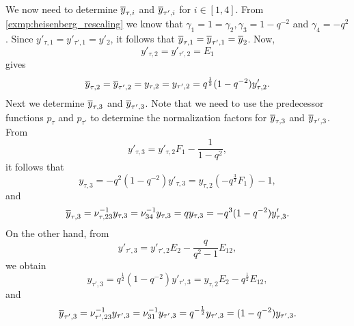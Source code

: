 \begin{example}
	We now need to determine $\overline{y}_{\tau, i}$ and $\overline{y}_{\tau',i}$ for $i \in [1,4]$. From
	\cref{exmp:heisenberg_rescaling} we know that $\gamma_1 = 1 = \gamma_2, \gamma_3 = 1
		-q^{-2}$ and $\gamma_4 = -q^2$. Since $y'_{\tau, 1} = y'_{\tau',1} = y'_2$, it follows
	that $\overline{y}_{\tau, 1} = \overline{y}_{\tau',1} = \overline{y}_2$. Now,
	\begin{equation*}
		y'_{\tau, 2} = y'_{\tau', 2} = E_1
	\end{equation*}
	gives
	\begin{equation*}
		\overline{y}_{\tau, 2} = \overline{y}_{\tau', 2} = y_{\tau, 2} = y_{\tau', 2} =  q^{\frac{1}{2}}(1-q^{-2})y'_{\tau, 2}.
	\end{equation*}
	Next we determine $\overline{y}_{\tau, 3}$ and $\overline{y}_{\tau', 3}$. Note that we need to use the predecessor functions $p_\tau$ and $p_{\tau'}$ to determine the normalization factors for $\overline{y}_{\tau, 3}$ and $\overline{y}_{\tau', 3}$. From
	\begin{equation*}
		y'_{\tau, 3} = y'_{\tau, 2}F_1 - \frac{1}{1-q^2},
	\end{equation*}
	it follows that
	\begin{equation*}
		y_{\tau, 3} = -q^2 (1-q^{-2})y'_{\tau, 3} = y_{\tau, 2}(-q^{\frac{3}{2}}F_1) - 1,
	\end{equation*}
	and
	\begin{equation*}
		\overline{y}_{\tau, 3} = \nu_{\tau, 23}^{-1} y_{\tau, 3} = \nu_{34}^{-1} y_{\tau, 3} = q y_{\tau, 3} = -q^3(1-q^{-2})y'_{\tau, 3}.
	\end{equation*}
	On the other hand, from
	\begin{equation*}
		y'_{\tau', 3} = y'_{\tau', 2}E_2 - \frac{q}{q^2 - 1}E_{12},
	\end{equation*}
	we obtain
	\begin{equation*}
		y_{\tau', 3} = q^{\frac{1}{2}}(1-q^{-2})y'_{\tau', 3} = y_{\tau, 2}E_2 - q^{\frac{1}{2}} E_{12},
	\end{equation*}
	and
	\begin{equation*}
		\overline{y}_{\tau', 3} = \nu_{\tau', 23}^{-1} y_{\tau', 3} = \nu_{31}^{-1} y_{\tau', 3} = q^{-\frac{1}{2}}y_{\tau', 3} = (1-q^{-2})y_{\tau',3}.
	\end{equation*}


\end{example}
